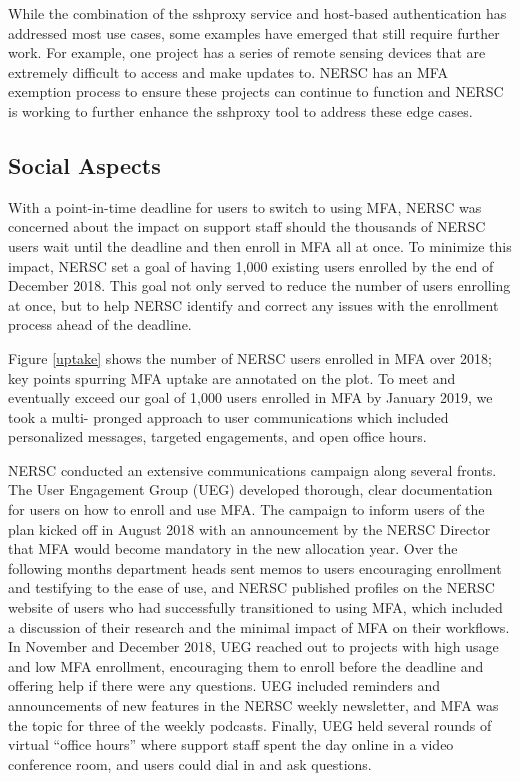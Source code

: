 \documentclass[sigconf,review]{acmart}
\begin{document}
While the combination of the sshproxy service and host-based authentication has
addressed most use cases, some examples have emerged that still require further
work.  For example, one project has a series of remote sensing devices that are
extremely difficult to access and make updates to.  NERSC has an MFA exemption
process to ensure these projects can continue to function and NERSC is working
to further enhance the sshproxy tool to address these edge cases.

\subsection{Social Aspects}
\label{social}

With a point-in-time deadline for users to switch to using MFA, NERSC was
concerned about the impact on support staff should the thousands of NERSC users
wait until the deadline and then enroll in MFA all at once. To minimize this
impact, NERSC set a goal of having 1,000 existing users enrolled by the end of
December 2018. This goal not only served to reduce the number of users enrolling
at once, but to help NERSC identify and correct any issues with the enrollment
process ahead of the deadline.

Figure \ref{uptake} shows the number of NERSC users enrolled in MFA over 2018;
key points spurring MFA uptake are annotated on the plot. To meet and eventually
exceed our goal of 1,000 users enrolled in MFA by January 2019, we took a multi-
pronged approach to user communications which included personalized messages,
targeted engagements, and open office hours.

NERSC conducted an extensive communications campaign along several fronts. The
User Engagement Group (UEG) developed thorough, clear documentation for users on
how to enroll and use MFA. The campaign to inform users of the plan kicked off
in August 2018 with an announcement by the NERSC Director that MFA would become
mandatory in the new allocation year. Over the following months department heads
sent memos to users encouraging enrollment and testifying to the ease of use,
and NERSC published profiles on the NERSC website of users who had successfully
transitioned to using MFA, which included a discussion of their research and the
minimal impact of MFA on their workflows. In November and December 2018, UEG
reached out to projects with high usage and low MFA enrollment, encouraging them
to enroll before the deadline and offering help if there were any questions. UEG
included reminders and announcements of new features in the NERSC weekly
newsletter, and MFA was the topic for three of the weekly podcasts. Finally, UEG
held several rounds of virtual ``office hours'' where support staff spent the
day online in a video conference room, and users could dial in and ask
questions.
\end{document}
